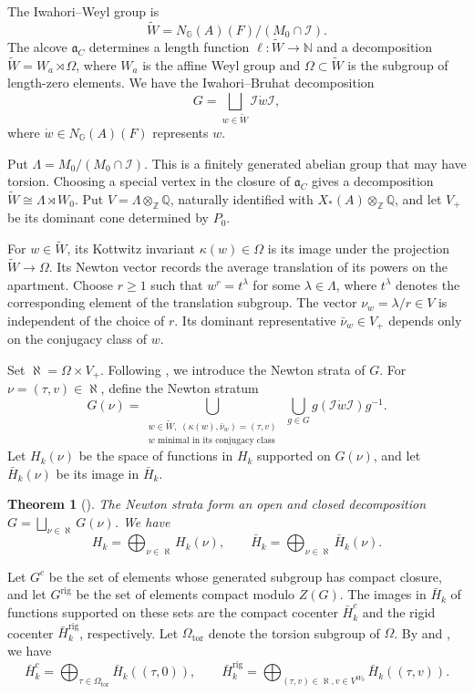 \documentclass[11pt,letterpaper]{amsart}
\newtheorem{theorem}{Theorem}
\theoremstyle{definition}
\numberwithin{equation}{section}
\numberwithin{theorem}{section}
\let\ge\geqslant
\newcommand{\kk}{k}
\newcommand{\ZZ}{\mathbb Z}
\newcommand{\QQ}{\mathbb Q}
\newcommand{\CI}{\mathcal I}
\newcommand{\G}{\mathbb G}
\newcommand{\Wt}{\tilde W}
\newcommand{\Waff}{W_a}
\newcommand{\rig}{\mathrm{rig}}
\begin{document}
The Iwahori--Weyl group is
\[
 \Wt=N_\G(A)(F)/(M_0\cap\CI).
\]
The alcove $\mathfrak a_C$ determines
a length function $\ell: \Wt \to \mathbb N$ and a decomposition
$\Wt=\Waff\rtimes\Omega$, where $\Waff$ is the affine
Weyl group and $\Omega \subset \Wt$ is the subgroup of length-zero
elements.
We have the Iwahori--Bruhat decomposition
\[
 G=\bigsqcup_{w\in\Wt}\CI\dot w\CI,
\]
where $\dot w\in N_\G(A)(F)$ represents $w$.

Put $\Lambda=M_0/(M_0\cap\CI)$. This is a finitely generated abelian group that may have torsion. Choosing a special vertex in the closure of $\mathfrak a_C$ gives a decomposition $\Wt\cong\Lambda\rtimes W_0$.
Put $V=\Lambda\otimes_\ZZ\QQ$, naturally
identified with $X_*(A)\otimes_\ZZ\QQ$, and let $V_+$
be its dominant cone determined by $P_0$.

For $w\in\Wt$, its Kottwitz invariant $\kappa(w)\in\Omega$
is its image under the projection $\Wt\to\Omega$.
Its Newton vector records the average translation
of its powers on the apartment. Choose $r\ge1$ such that
$w^r=t^\lambda$ for some $\lambda\in\Lambda$, where $t^\lambda$ denotes the corresponding element of the translation subgroup. The vector $\nu_w=\lambda/r\in V$ is independent of the choice of $r$. Its dominant representative $\bar\nu_w\in V_+$
depends only on the conjugacy class of $w$.

Set $\aleph=\Omega\times V_+$. Following \cite[\S2]{HeI}, we introduce the Newton strata  of  $G$. For $\nu=(\tau,v)\in\aleph$, define the Newton stratum
\[
G(\nu)=
 \bigcup_{\substack{w\in\Wt,\;(\kappa(w),\bar\nu_w)=(\tau,v)\\
                   w\text{ minimal in its conjugacy class}}}
 \ \bigcup_{g\in G}g(\CI\dot w\CI)g^{-1}.
\]
Let $H_\kk(\nu)$ be the space of functions in $H_\kk$
supported on $G(\nu)$, and let $\bar H_\kk(\nu)$ be its
image in $\bar H_\kk$. 

\begin{theorem}[{\cite[Theorems~3 and~10]{HeI}}]
\label{thm:newton-decomposition}
The Newton strata form an open and closed decomposition
$G=\bigsqcup_{\nu\in\aleph}G(\nu)$. We have
\[
H_\kk=\bigoplus_{\nu\in\aleph}H_\kk(\nu),
 \qquad
 \bar H_\kk=\bigoplus_{\nu\in\aleph}\bar H_\kk(\nu).
\]
\end{theorem}

Let $G^c$ be the set of elements whose generated subgroup
has compact closure, and let $G^{\rig}$ be the set of
elements compact modulo $Z(G)$. The images in $\bar H_\kk$
of functions supported on these sets are the compact
cocenter $\bar H_\kk^c$ and the rigid cocenter
$\bar H_\kk^{\rig}$, respectively. Let
$\Omega_{\mathrm{tor}}$ denote the torsion subgroup of
$\Omega$. By \cite[\S6.1]{HeI} and \cite[\S7.1]{CHIII}, we have
\[
 \bar H_\kk^c
   =\bigoplus_{\tau\in\Omega_{\mathrm{tor}}}
      \bar H_\kk((\tau,0)),
 \qquad
 \bar H_\kk^{\rig}
   =\bigoplus_{(\tau,v)\in\aleph, v\in V^{W_0}}
      \bar H_\kk((\tau,v)).
\]
\end{document}
